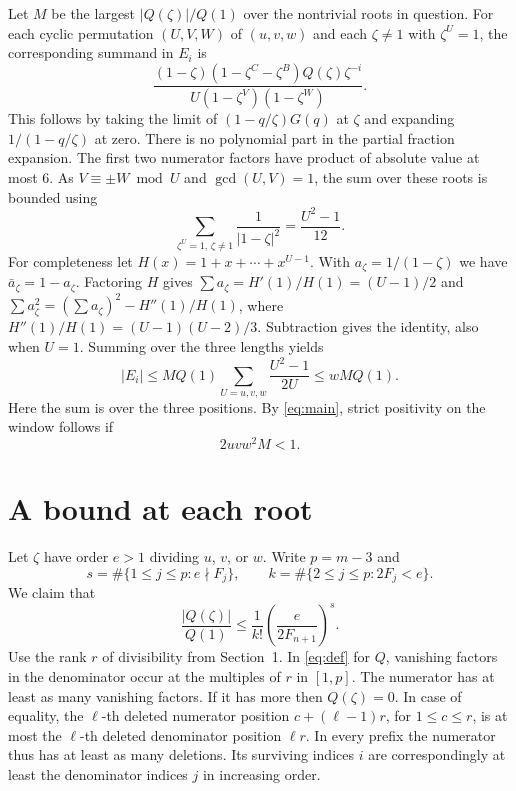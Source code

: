 \documentclass[11pt]{article}
\newcommand{\abs}[1]{\lvert#1\rvert}
\begin{document}
Let \(M\) be the largest \(\abs{Q(\zeta)}/Q(1)\) over the nontrivial
roots in question. For each cyclic permutation \((U,V,W)\) of
\((u,v,w)\) and each \(\zeta\ne1\) with \(\zeta^U=1\), the
corresponding summand in \(E_i\) is
\[
 \frac{(1-\zeta)(1-\zeta^C-\zeta^B)Q(\zeta)\zeta^{-i}}
      {U(1-\zeta^V)(1-\zeta^W)}.
\]
This follows by taking the limit of \((1-q/\zeta)G(q)\) at \(\zeta\)
and expanding \(1/(1-q/\zeta)\) at zero. There is no polynomial
part in the partial fraction expansion. The first two numerator
factors have product of absolute value at most \(6\).
As \(V\equiv\pm W\bmod U\) and \(\gcd(U,V)=1\), the sum over these
roots is bounded using
\[
 \sum_{\zeta^U=1,\,\zeta\ne1}\frac1{\abs{1-\zeta}^2}
 =\frac{U^2-1}{12}.
\]
For completeness let \(H(x)=1+x+\cdots+x^{U-1}\). With
\(a_\zeta=1/(1-\zeta)\) we have
\(\bar a_\zeta=1-a_\zeta\).
Factoring \(H\) gives \(\sum a_\zeta=H'(1)/H(1)=(U-1)/2\) and
\(\sum a_\zeta^2=(\sum a_\zeta)^2-H''(1)/H(1)\), where
\(H''(1)/H(1)=(U-1)(U-2)/3\). Subtraction gives the identity, also
when \(U=1\). Summing over the three lengths yields
\[
 \abs{E_i}\le M Q(1)\sum_{U=u,v,w}\frac{U^2-1}{2U}
 \le wM Q(1).
\]
Here the sum is over the three positions. By \eqref{eq:main}, strict
positivity on the window follows if
\begin{equation}\label{eq:target} 2uvw^2 M<1. \end{equation}

\section{A bound at each root}
Let \(\zeta\) have order \(e>1\) dividing \(u\), \(v\), or \(w\).
Write \(p=m-3\) and
\[
 s=\#\{1\le j\le p:e\nmid F_j\},\qquad
 k=\#\{2\le j\le p:2F_j<e\}.
\]
We claim that
\begin{equation}\label{eq:root}
 \frac{\abs{Q(\zeta)}}{Q(1)}
 \le \frac1{k!}\left(\frac{e}{2F_{n+1}}\right)^s .
\end{equation}
Use the rank \(r\) of divisibility from Section~1. In \eqref{eq:def}
for \(Q\), vanishing factors in the denominator occur at the multiples
of \(r\) in \([1,p]\). The numerator has at least as many vanishing
factors. If it has more then \(Q(\zeta)=0\). In case of equality,
the \(\ell\)-th deleted numerator position \(c+(\ell-1)r\), for
\(1\le c\le r\), is at most the \(\ell\)-th deleted denominator
position \(\ell r\). In every prefix the numerator thus has at least
as many deletions. Its surviving indices \(i\) are correspondingly
at least the denominator indices \(j\) in increasing order.
\end{document}
